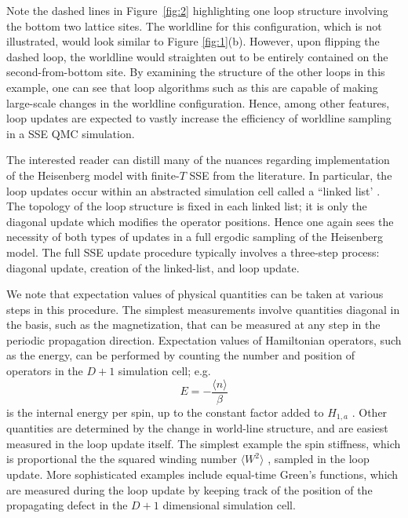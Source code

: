 \documentclass[vecphys]{svmult}
\begin{document}
Note the dashed lines in Figure~\ref{fig:2} highlighting one loop structure involving the bottom two lattice sites.  The worldline for this configuration, which is not illustrated, would look similar to Figure \ref{fig:1}(b).  However, upon flipping the dashed loop, the worldline would straighten out to be entirely contained on the second-from-bottom site.  By examining the structure of the other loops in this example, one can see that loop algorithms such as this are capable of making large-scale changes in the worldline configuration.  Hence, among other features, loop updates are expected to vastly increase the efficiency of worldline sampling in a SSE QMC simulation.

The interested reader can distill many of the nuances regarding implementation of the Heisenberg model with finite-$T$ SSE from the literature.    In particular, the loop updates occur within an abstracted simulation cell called a ``linked list' \cite{Melko:Syljuasen02}.  The topology of the loop structure is fixed in each linked list; it is only the diagonal update which modifies the operator positions.  Hence one again sees the necessity of both types of updates in a full ergodic sampling of the Heisenberg model.  The full SSE update procedure typically involves a three-step process: diagonal update, creation of the linked-list, and loop update.  

We note that expectation values of physical quantities can be taken at various steps in this procedure.  The simplest measurements involve quantities diagonal in the basis, such as the magnetization, that can be measured at any step in the periodic propagation direction.  Expectation values of Hamiltonian operators, such as the energy, can be performed by counting the number and position of operators in the $D+1$ simulation cell; e.g.
\begin{equation}
E = - \frac{\langle n \rangle}{\beta}
\end{equation}
is the internal energy per spin, up to the constant factor added to $H_{1,a}$  \cite{Melko:Sandvik99}.
Other quantities are determined by the change in world-line structure, and are easiest measured in the loop update itself.  The simplest example the spin stiffness, which is proportional the the squared winding number $\langle W^2 \rangle$ \cite{Melko:PC}, sampled in the loop update.  More sophisticated examples include equal-time Green's functions, which are measured during the loop update by keeping track of the position of the propagating defect in the $D+1$ dimensional simulation cell.
\end{document}
